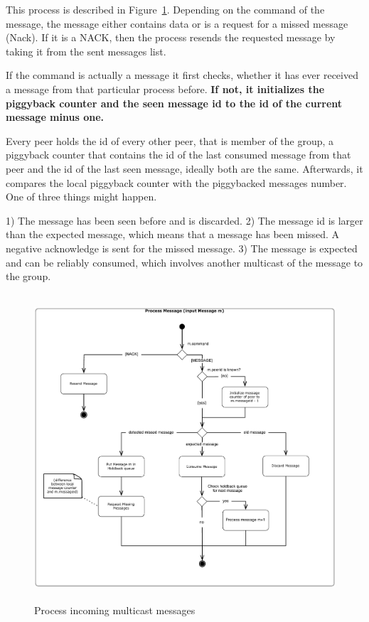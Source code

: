 This process is described in Figure~\ref{fig:figures_processMessages}.
Depending on the command of the message, the message either contains data or is a request for a missed message (Nack). If it is a NACK,  then the process resends the requested message by taking it from the sent messages list.



If the command is actually a message it first checks, whether it has ever received a message from that particular process before. \textbf{If not, it initializes the piggyback counter and the seen message id to the id of the current message minus one. } 

Every peer holds the id of every other peer, that is member of the group, a piggyback counter that contains the id of the last consumed message from that peer and the id of the last seen message, ideally both are the same.
Afterwards, it compares the local piggyback counter with the piggybacked messages number. One of three things might happen. 

1) The message has been seen before and is discarded.
2) The message id is larger than the expected message, which means that a message has been missed. A negative acknowledge is sent for the missed message. 
3) The message is expected and can be reliably consumed, which involves another multicast of the message to the group.
 
\begin{figure}[htbp]
    \centering
        \includegraphics[height=4.5in]{figures/processMessages.pdf}
    \caption{Process incoming multicast messages}
    \label{fig:figures_processMessages}
\end{figure}

